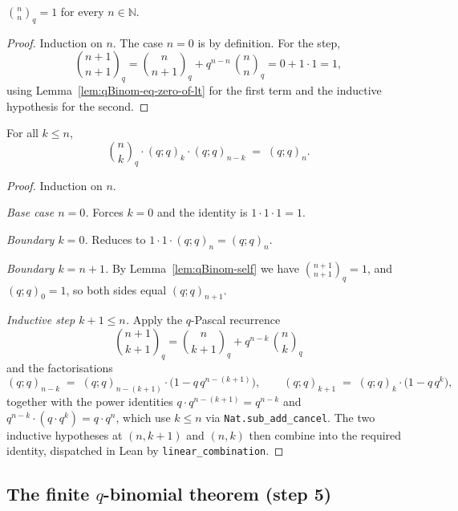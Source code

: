 \begin{lemma}[Diagonal]\label{lem:qBinom-self}\leanok{}
$\binom{n}{n}_q = 1$ for every $n \in \mathbb{N}$.
\end{lemma}

\begin{proof}\leanok
Induction on $n$. The case $n = 0$ is by definition. For the step,
\[
  \binom{n+1}{n+1}_q
    = \binom{n}{n+1}_q + q^{n-n}\,\binom{n}{n}_q
    = 0 + 1 \cdot 1 = 1,
\]
using Lemma~\ref{lem:qBinom-eq-zero-of-lt} for the first term and the
inductive hypothesis for the second.
\end{proof}

\begin{lemma}\label{lem:qBinom-closed-form}\leanok{}
For all $k \leq n$,
\[
  \binom{n}{k}_q \cdot (q; q)_k \cdot (q; q)_{n - k} \;=\; (q; q)_n.
\]
\end{lemma}

\begin{proof}\leanok
Induction on $n$.

\emph{Base case $n = 0$.} Forces $k = 0$ and the identity is $1 \cdot 1 \cdot 1 = 1$.

\emph{Boundary $k = 0$.} Reduces to $1 \cdot 1 \cdot (q; q)_n = (q; q)_n$.

\emph{Boundary $k = n + 1$.} By Lemma~\ref{lem:qBinom-self} we have
$\binom{n+1}{n+1}_q = 1$, and $(q; q)_0 = 1$, so both sides equal
$(q; q)_{n+1}$.

\emph{Inductive step $k + 1 \leq n$.} Apply the $q$-Pascal recurrence
\[
  \binom{n+1}{k+1}_q = \binom{n}{k+1}_q + q^{n-k}\,\binom{n}{k}_q
\]
and the factorisations
\[
  (q; q)_{n - k} \;=\; (q; q)_{n - (k+1)} \cdot \bigl(1 - q\,q^{n-(k+1)}\bigr),
  \qquad
  (q; q)_{k + 1} \;=\; (q; q)_k \cdot \bigl(1 - q\,q^k\bigr),
\]
together with the power identities $q \cdot q^{n-(k+1)} = q^{n-k}$ and
$q^{n-k} \cdot (q \cdot q^k) = q \cdot q^n$, which use $k \leq n$ via
\texttt{Nat.sub\_add\_cancel}. The two inductive hypotheses at $(n, k+1)$
and $(n, k)$ then combine into the required identity, dispatched in Lean
by \texttt{linear\_combination}.
\end{proof}

\subsection{The finite $q$-binomial theorem (step 5)}\label{subsec:qbin-finite-formalized}

